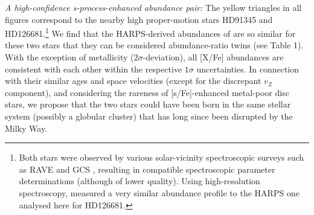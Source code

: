 \documentclass{aa}  %
\begin{document}
{\it A high-confidence s-process-enhanced abundance pair:} The yellow triangles in all figures correspond to the nearby high proper-motion stars HD91345 and HD126681.\footnote{Both stars were observed by various solar-vicinity spectroscopic surveys such as RAVE \citep{Steinmetz2006, Kunder2017} and GCS \citep{Nordstroem2004, Casagrande2011}, resulting in compatible spectroscopic parameter determinations (although of lower quality). Using high-resolution spectroscopy, \citet{Bensby2014} measured a very similar abundance profile to the HARPS one analysed here for HD126681.} We find that the HARPS-derived abundances of \citet{DelgadoMena2017} are so similar for these two stars that they can be considered abundance-ratio twins (see Table 1). With the exception of metallicity ($2\sigma$-deviation), all [X/Fe] abundances are consistent with each other within the respective $1\sigma$ uncertainties. In connection with their similar ages and space velocities (except for the discrepant $v_Z$ component), and considering the rareness of [s/Fe]-enhanced metal-poor disc stars, we propose that the two stars could have been born in the same stellar system (possibly a globular cluster) that has long since been disrupted by the Milky Way.
\end{document}
